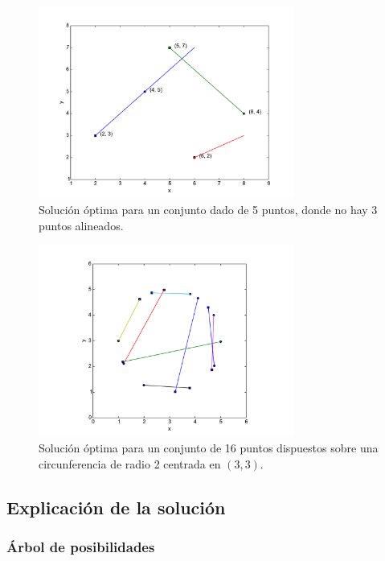 \begin{figure}[H]
  \centering
  \includegraphics[width=0.75\textwidth]{img/ejemplos/ej3-3.pdf}
  \caption{\footnotesize Solución óptima para un conjunto dado de 5 puntos, donde no hay 3 puntos alineados.}
  \label{fig:ej3-3}
\end{figure}

\begin{figure}[H]
  \centering
  \includegraphics[width=0.75\textwidth]{img/ejemplos/ej3-4.pdf}
  \caption{\footnotesize Solución óptima para un conjunto de 16 puntos dispuestos sobre una circunferencia de radio 2 centrada en $(3,3)$.}
  \label{fig:ej3-4}
\end{figure}

\subsection{Explicación de la solución}
\subsubsection{Árbol de posibilidades}

